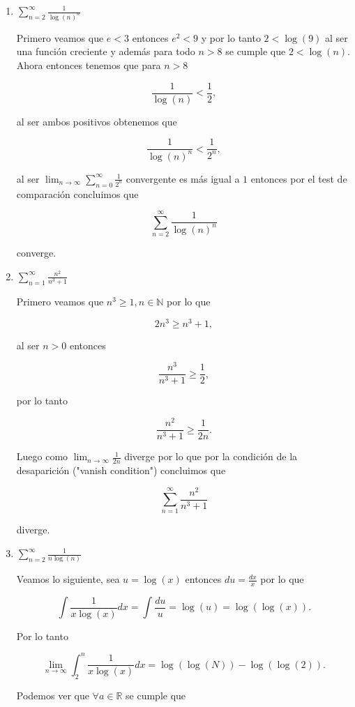 \documentclass[letterpaper]{article}
\theoremstyle{definition}
\theoremstyle{lemathm}
\theoremstyle{lemademthm}
\newcommand{\limninf}{\lim_{n\to\infty}}
\newcommand{\N}{\mathbb{N}}
\newcommand{\R}{\mathbb{R}}
\begin{document}
\begin{enumerate}
		\begin{enumerate}
			\item $\sum_{n=2}^{\infty} \frac{1}{\log(n)^n}$
			
			Primero veamos que $e < 3$ entonces $e^2 < 9$ y por lo tanto $2 < \log(9)$ al ser una función creciente y además para todo $n > 8$ se cumple que $2 < \log(n)$. Ahora entonces tenemos que para $n > 8$

			\[\frac{1}{\log(n)} < \frac{1}{2},\]

			al ser ambos positivos obtenemos que

			\[\frac{1}{\log(n)^n} < \frac{1}{2^n},\]

			al ser $\limninf \sum_{n=0}^{\infty} \frac{1}{2^n}$ convergente es más igual a $1$ entonces por el test de comparación concluimos que

			\[\sum_{n=2}^{\infty} \frac{1}{\log(n)^n}\]

			converge.

			\item $\sum_{n=1}^{\infty} \frac{n^2}{n^3+1}$
			
			Primero veamos que $n^3 \geq 1, n \in \N$ por lo que

			\[2n^3 \geq n^3 + 1,\]

			al ser $n > 0$ entonces

			\[\frac{n^3}{n^3+1} \geq \frac{1}{2},\]
			
			por lo tanto

			\[\frac{n^2}{n^3+1} \geq \frac{1}{2n}.\]

			Luego como $\limninf \frac{1}{2n}$ diverge por lo que por la condición de la desaparición ("vanish condition") concluimos que

			\[\sum_{n=1}^{\infty} \frac{n^2}{n^3+1}\]

			diverge.

			\newpage

			\item $\sum_{n=2}^{\infty} \frac{1}{n\log(n)}$
			
			Veamos lo siguiente, sea $u = \log(x)$ entonces $du = \frac{dx}{x}$ por lo que

			\[\int \frac{1}{x\log(x)}dx = \int \frac{du}{u} = \log(u) = \log(\log(x)).\]

			Por lo tanto

			\[\limninf \int_{2}^{n} \frac{1}{x\log(x)}dx = \log(\log(N)) - \log(\log(2)).\]

			Podemos ver que $\forall a \in \R$ se cumple que


\end{enumerate}
\end{enumerate}
\end{document}
